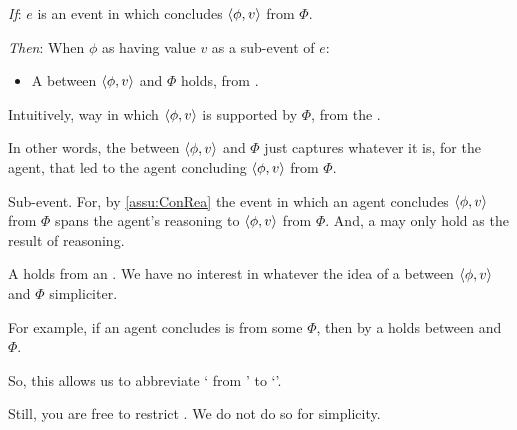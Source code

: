 \begin{note}
  \begin{idea}[\supportI{}]
    \label{idea:support}
    \vspace{-\baselineskip}
    \begin{itenum}
    \item[\emph{If}:]
      \(e\) is an event in which \vAgent{} concludes \(\langle \phi, v \rangle\) from \(\Phi\).
    \item[\emph{Then}:]
      When \vAgent{}  \(\phi\) as having value \(v\) as a sub-event of \(e\):
      \begin{itemize}
      \item
        A \emph{\ros{}} between \(\langle \phi, v \rangle\) and \(\Phi\) holds, from .
      \end{itemize}
    \end{itenum}
    \vspace{-\baselineskip}
  \end{idea}

  Intuitively, way in which \(\langle \phi, v \rangle\) is supported by \(\Phi\), from the \agpe{}.

  In other words, the \ros{} between \(\langle \phi, v \rangle\) and \(\Phi\) just captures whatever it is, for the agent, that led to the agent concluding \(\langle \phi, v \rangle\) from \(\Phi\).
\end{note}

\begin{note}
  Sub-event.
  For, by \autoref{assu:ConRea} the event in which an agent concludes \(\langle \phi, v \rangle\) from \(\Phi\) spans the agent's reasoning to \(\langle \phi, v \rangle\) from \(\Phi\).
  And, a \ros{} may only hold as the result of reasoning.
\end{note}

\begin{note}
  A \ros{} holds from an \agpe{}.
  We have no interest in whatever the idea of a \ros{} between \(\langle \phi, v \rangle\) and \(\Phi\) simpliciter.

  For example, if an agent concludes  is  from some \pool{} \(\Phi\), then by \supportI{} a \ros{} holds between  and \(\Phi\).

  {
    \color{red}
    So, this allows us to abbreviate `\ros{} from \agpe{}' to `\ros{}'.
  }

  {
    \color{green}
    Still, you are free to restrict \supportI{}.
    We do not do so for simplicity.
  }
\end{note}

